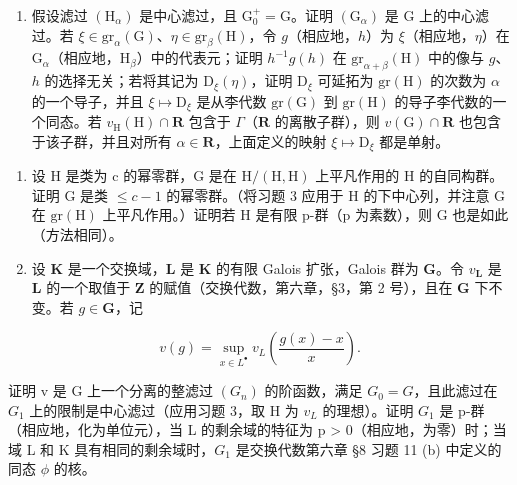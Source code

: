 \begin{enumerate}
\def\labelenumi{(\alph{enumi})}
\setcounter{enumi}{1}
\tightlist
\item
  假设滤过 \((\mathrm{H}_{\alpha})\) 是中心滤过，且 \(\mathrm{G}_0^+ = \mathrm{G}\)。证明 \((\mathrm{G}_{\alpha})\) 是 G 上的中心滤过。若 \(\xi \in \mathrm{gr}_{\alpha}(\mathrm{G})\)、\(\eta \in \mathrm{gr}_{\beta}(\mathrm{H})\)，令 \(g\)（相应地，\(h\)）为 \(\xi\)（相应地，\(\eta\)）在 \(\mathrm{G}_{\alpha}\)（相应地，\(\mathrm{H}_{\beta}\)）中的代表元；证明 \(h^{-1}g(h)\) 在 \(\mathrm{gr}_{\alpha + \beta}(\mathrm{H})\) 中的像与 \(g\)、\(h\) 的选择无关；若将其记为 \(\mathrm{D}_{\xi}(\eta)\)，证明 \(\mathrm{D}_{\xi}\) 可延拓为 \(\mathrm{gr}(\mathrm{H})\) 的次数为 \(\alpha\) 的一个导子，并且 \(\xi \mapsto \mathrm{D}_{\xi}\) 是从李代数 \(\mathrm{gr}(\mathrm{G})\) 到 \(\mathrm{gr}(\mathrm{H})\) 的导子李代数的一个同态。若 \(v_{\mathrm{H}}(\mathrm{H}) \cap \mathbf{R}\) 包含于 \(\Gamma\)（\(\mathbf{R}\) 的离散子群），则 \(v(\mathrm{G}) \cap \mathbf{R}\) 也包含于该子群，并且对所有 \(\alpha \in \mathbf{R}\)，上面定义的映射 \(\xi \mapsto \mathrm{D}_{\xi}\) 都是单射。
\end{enumerate}

\begin{enumerate}
\def\labelenumi{\arabic{enumi}.}
\setcounter{enumi}{3}
\item
  设 H 是类为 c 的幂零群，G 是在 \(\mathrm{H}/(\mathrm{H},\mathrm{H})\) 上平凡作用的 H 的自同构群。证明 G 是类 \(\leqslant c - 1\) 的幂零群。（将习题 3 应用于 H 的下中心列，并注意 G 在 \(\mathrm{gr}(\mathrm{H})\) 上平凡作用。）证明若 H 是有限 p-群（p 为素数），则 G 也是如此（方法相同）。
\item
  设 \(\mathbf{K}\) 是一个交换域，\(\mathbf{L}\) 是 \(\mathbf{K}\) 的有限 Galois 扩张，Galois 群为 \(\mathbf{G}\)。令 \(v_{\mathbf{L}}\) 是 \(\mathbf{L}\) 的一个取值于 \(\mathbf{Z}\) 的赋值（交换代数，第六章，§3，第 2 号），且在 \(\mathbf{G}\) 下不变。若 \(g \in \mathbf{G}\)，记
\end{enumerate}

\[
v (g) = \sup _ {x \in L ^ {\bullet}} v _ {L} \left(\frac {g (x) - x}{x}\right).
\]

证明 v 是 G 上一个分离的整滤过 \((G_{n})\) 的阶函数，满足 \(G_{0} = G\)，且此滤过在 \(G_{1}\) 上的限制是中心滤过（应用习题 3，取 H 为 \(v_{L}\) 的理想）。证明 \(G_{1}\) 是 p-群（相应地，化为单位元），当 L 的剩余域的特征为 p \textgreater{} 0（相应地，为零）时；当域 L 和 K 具有相同的剩余域时，\(G_{1}\) 是交换代数第六章 §8 习题 11 (b) 中定义的同态 \(\phi\) 的核。

